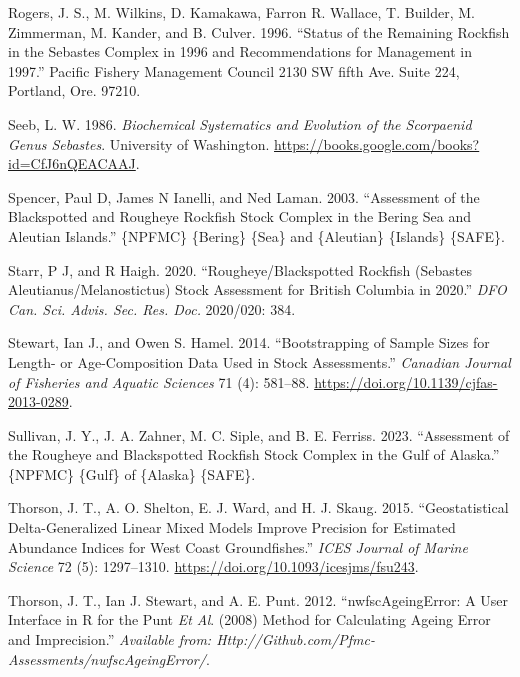 \documentclass[
]{scrartcl}
\newlength{\cslhangindent}
\newenvironment{CSLReferences}[2] %
 {\begin{list}{}{%
  \setlength{\itemindent}{0pt}
  \setlength{\leftmargin}{0pt}
  \setlength{\parsep}{0pt}
  \ifodd #1
   \setlength{\leftmargin}{\cslhangindent}
   \setlength{\itemindent}{-1\cslhangindent}
  \fi
  \setlength{\itemsep}{#2\baselineskip}}}
 {\end{list}}
\begin{document}
\begin{CSLReferences}{1}{0}
Rogers, J. S., M. Wilkins, D. Kamakawa, Farron R. Wallace, T. Builder,
M. Zimmerman, M. Kander, and B. Culver. 1996. {``Status of the
{Remaining} {Rockfish} in the {Sebastes} {Complex} in 1996 and
Recommendations for Management in 1997.''} Pacific Fishery Management
Council 2130 SW fifth Ave. Suite 224, Portland, Ore. 97210.

Seeb, L. W. 1986. \emph{Biochemical {Systematics} and {Evolution} of the
{Scorpaenid} {Genus} {Sebastes}}. University of Washington.
\url{https://books.google.com/books?id=CfJ6nQEACAAJ}.

Spencer, Paul D, James N Ianelli, and Ned Laman. 2003. {``Assessment of
the {Blackspotted} and {Rougheye} {Rockfish} {Stock} {Complex} in the
{Bering} {Sea} and {Aleutian} {Islands}.''} \{NPFMC\} \{Bering\} \{Sea\}
and \{Aleutian\} \{Islands\} \{SAFE\}.

Starr, P J, and R Haigh. 2020. {``Rougheye/{Blackspotted} {Rockfish}
({Sebastes} Aleutianus/Melanostictus) Stock Assessment for {British}
{Columbia} in 2020.''} \emph{DFO Can. Sci. Advis. Sec. Res. Doc.}
2020/020: 384.

Stewart, Ian J., and Owen S. Hamel. 2014. {``Bootstrapping of Sample
Sizes for Length- or Age-Composition Data Used in Stock Assessments.''}
\emph{Canadian Journal of Fisheries and Aquatic Sciences} 71 (4):
581--88. \url{https://doi.org/10.1139/cjfas-2013-0289}.

Sullivan, J. Y., J. A. Zahner, M. C. Siple, and B. E. Ferriss. 2023.
{``Assessment of the {Rougheye} and {Blackspotted} {Rockfish} Stock
Complex in the {Gulf} of {Alaska}.''} \{NPFMC\} \{Gulf\} of \{Alaska\}
\{SAFE\}.

Thorson, J. T., A. O. Shelton, E. J. Ward, and H. J. Skaug. 2015.
{``Geostatistical Delta-Generalized Linear Mixed Models Improve
Precision for Estimated Abundance Indices for {West} {Coast}
Groundfishes.''} \emph{ICES Journal of Marine Science} 72 (5):
1297--1310. \url{https://doi.org/10.1093/icesjms/fsu243}.

Thorson, J. T., Ian J. Stewart, and A. E. Punt. 2012.
{``{nwfscAgeingError}: A User Interface in {R} for the {P}unt \emph{Et
Al}. (2008) Method for Calculating Ageing Error and Imprecision.''}
\emph{Available from:
Http://Github.com/Pfmc-Assessments/nwfscAgeingError/}.


\end{CSLReferences}
\end{document}
